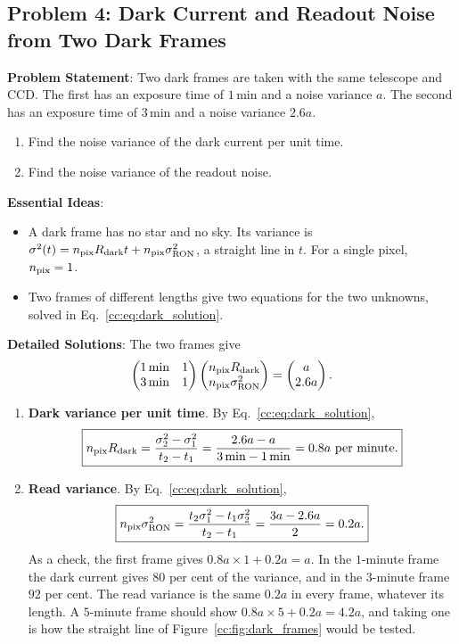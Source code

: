 \subsection{Problem 4: Dark Current and Readout Noise from Two Dark Frames}
\label{cc:prob:dark}

\textbf{Problem Statement}: Two dark frames are taken with the same telescope and CCD. The first has an exposure time of $1\,\mathrm{min}$ and a noise variance $a$. The second has an exposure time of $3\,\mathrm{min}$ and a noise variance $2.6a$.
\begin{enumerate}[label=(\alph*)]
	\item Find the noise variance of the dark current per unit time.
	\item Find the noise variance of the readout noise.
\end{enumerate}

\textbf{Essential Ideas}:
\begin{itemize}
	\item A dark frame has no star and no sky. Its variance is $\sigma^2(t)=n_{\rm pix}R_{\rm dark}t+n_{\rm pix}\sigma_{\rm RON}^2$, a straight line in $t$. For a single pixel, $n_{\rm pix}=1$.
	\item Two frames of different lengths give two equations for the two unknowns, solved in Eq.~\eqref{cc:eq:dark_solution}.
\end{itemize}

\textbf{Detailed Solutions}: The two frames give
\[
\begin{pmatrix} 1\,\mathrm{min} & 1\\ 3\,\mathrm{min} & 1\end{pmatrix}
\begin{pmatrix} n_{\rm pix}R_{\rm dark}\\ n_{\rm pix}\sigma_{\rm RON}^2\end{pmatrix}
=\begin{pmatrix} a\\ 2.6a\end{pmatrix}.
\]
\begin{enumerate}[label=(\alph*)]
	\item \textbf{Dark variance per unit time}. By Eq.~\eqref{cc:eq:dark_solution},
	\[
	\boxed{n_{\rm pix}R_{\rm dark}=\frac{\sigma_2^2-\sigma_1^2}{t_2-t_1}=\frac{2.6a-a}{3\,\mathrm{min}-1\,\mathrm{min}}=0.8a\ \text{per minute}.}
	\]
	\item \textbf{Read variance}. By Eq.~\eqref{cc:eq:dark_solution},
	\[
	\boxed{n_{\rm pix}\sigma_{\rm RON}^2=\frac{t_2\sigma_1^2-t_1\sigma_2^2}{t_2-t_1}=\frac{3a-2.6a}{2}=0.2a.}
	\]
	As a check, the first frame gives $0.8a\times1+0.2a=a$. In the $1$-minute frame the dark current gives $80$ per cent of the variance, and in the $3$-minute frame $92$ per cent. The read variance is the same $0.2a$ in every frame, whatever its length. A $5$-minute frame should show $0.8a\times5+0.2a=4.2a$, and taking one is how the straight line of Figure~\ref{cc:fig:dark_frames} would be tested.
\end{enumerate}

